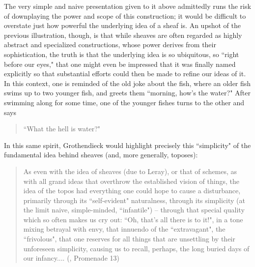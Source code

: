 \documentclass[a4paper]{book}
\theoremstyle{definition}
\theoremstyle{definition}
\theoremstyle{definition}
\theoremstyle{theorem}
\theoremstyle{definition}
\begin{document}
	The very simple and naive presentation given to it above admittedly runs the risk of downplaying the power and scope of this construction; it would be difficult to overstate just how powerful the underlying idea of a sheaf is. An upshot of the previous illustration, though, is that while sheaves are often regarded as highly abstract and specialized constructions, whose power derives from their sophistication, the truth is that the underlying idea is so ubiquitous, so ``right before our eyes," that one might even be impressed that it was finally named explicitly so that substantial efforts could then be made to refine our ideas of it. In this context, one is reminded of the old joke about the fish, where an older fish swims up to two younger fish, and greets them ``morning, how's the water?" After swimming along for some time, one of the younger fishes turns to the other and says   
	\begin{quote}
		``What the hell is water?"
	\end{quote} 
	 In this same spirit, Grothendieck  would highlight precisely this ``simplicity" of the fundamental idea behind sheaves (and, more generally, toposes):  
	\begin{quote}
		As even with the idea of sheaves (due to Leray), or that of schemes, as with all grand ideas that overthrow the established vision of things, the idea of the topos had everything one could hope to cause a disturbance, primarily through its ``self-evident" naturalness, through its simplicity (at the limit naive, simple-minded,  ``infantile") -- through that special quality which so often makes us cry out: ``Oh, that's all there is to it!", in a tone mixing betrayal with envy, that innuendo of the ``extravagant", the ``frivolous", that one reserves for all things that are unsettling by their unforeseen simplicity, causing us to recall, perhaps, the long buried days of our infancy.... (\cite{grothendieck_recoltes_1986}, Promenade 13) 
	\end{quote}
\end{document}
